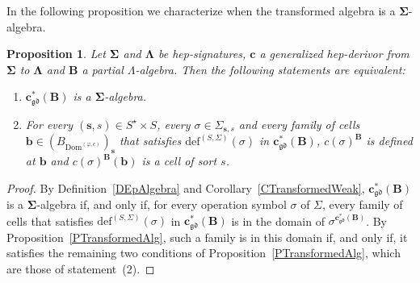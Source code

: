 \documentclass[a4paper, reqno
]{amsart}
\newcommand{\sig}[1]{\mathbf{#1}}             %
\newcommand{\Dom}{\mathrm{Dom}}
\newcommand{\gd}{\mathfrak{gd}}              %
\theoremstyle{plain}
\newtheorem{proposition}[theorem]{Proposition}
\newtheorem{corollary}[theorem]{Corollary}
\theoremstyle{definition}
\begin{document}


In the following proposition we characterize when the transformed algebra is a $\sig{\Sigma}$-algebra.

\begin{proposition}\label{PTransformedEpAlg}
Let $\sig{\Sigma}$ and $\sig{\Lambda}$ be hep-signatures, $\mathbf{c}$ a generalized hep-derivor from $\sig{\Sigma}$ to $\sig{\Lambda}$ and $\mathbf{B}$ a partial $\Lambda$-algebra.
Then the following statements are equivalent:
\begin{enumerate}
\item $\mathbf{c}^{\ast}_{\gd}(\mathbf{B})$ is a $\sig{\Sigma}$-algebra.
\item For every $(\mathbf{s},s)\in S^{\star}\times S$, every $\sigma\in\Sigma_{\mathbf{s},s}$ and every family of cells $\mathbf{b}\in(B_{\Dom^{(\varphi,c)}})_{\mathbf{s}}$ that satisfies $\mathrm{def}^{(S,\Sigma)}(\sigma)$ in $\mathbf{c}^{\ast}_{\gd}(\mathbf{B})$, $c(\sigma)^{\mathbf{B}}$ is defined at $\mathbf{b}$ and $c(\sigma)^{\mathbf{B}}(\mathbf{b})$ is a cell of sort $s$.
\end{enumerate}
\end{proposition}
\begin{proof}
By Definition~\ref{DEpAlgebra} and Corollary~\ref{CTransformedWeak}, $\mathbf{c}^{\ast}_{\gd}(\mathbf{B})$ is a $\sig{\Sigma}$-algebra if, and only if, for every operation symbol $\sigma$ of $\Sigma$, every family of cells that satisfies $\mathrm{def}^{(S,\Sigma)}(\sigma)$ in $\mathbf{c}^{\ast}_{\gd}(\mathbf{B})$ is in the domain of $\sigma^{\mathbf{c}^{\ast}_{\gd}(\mathbf{B})}$.
By Proposition~\ref{PTransformedAlg}, such a family is in this domain if, and only if, it satisfies the remaining two conditions of Proposition~\ref{PTransformedAlg}, which are those of statement~(2).
\end{proof}
\end{document}
